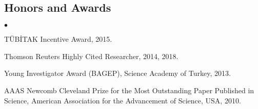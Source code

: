\documentclass[margin,line]{res}
\newenvironment{list2}{
  \begin{list}{$\bullet$}{%
      \setlength{\itemsep}{0.1cm}
      \setlength{\parsep}{0in} \setlength{\parskip}{0in}
      \setlength{\topsep}{0in} \setlength{\partopsep}{0in} 
      \setlength{\leftmargin}{0.2in}}}{\end{list}}
\newenvironment{list4}{
  \begin{list}{$\bullet$}{%
      \setlength{\itemsep}{0cm}
      \setlength{\parsep}{0in} \setlength{\parskip}{0in}
      \setlength{\topsep}{0in} \setlength{\partopsep}{0in} 
      \setlength{\leftmargin}{0.2in}}}{\end{list}}
\newcommand{\junk}[1]{}
\begin{document}
\begin{resume}
          \junk{
            \section{\sc Academic Experience}
                    {\bf Case Western Reserve University}, Cleveland, Ohio, USA\\
                    
                    \vspace{-.2cm}
                           {\em Graduate Student \& Research Assistant} \hfill {\bf August, 2000
                             - August 2005}\\
                           Included  Ph.D.~research, Ph.D. level course work and
                           research projects, reviewing papers for bioinformatics, algorithms and
                           database conferences and journals.
                           
                           {\em Teaching Assistant} \hfill {\bf August, 2000  - May 2001}\\
                           Duties included grading homeworks, and office hours. 
                           \begin{list2}
                           \item Systems Programming, Fall 2000
                           \item Introduction to Bioinformatics, Fall 2001
                           \item Analysis of Algorithms, Spring 2001
                           \end{list2}
          }
          
          \clearpage
          
          \vspace*{-.2cm}
          \section{\sc Honors and Awards} 
          \begin{list4}
          \item
            TÜBİTAK Incentive Award, 2015.
          \item
            Thomson Reuters Highly Cited Researcher, 2014, 2018.
          \item
            Young Investigator Award (BAGEP), Science Academy of Turkey, 2013.
          \item
            AAAS Newcomb Cleveland Prize for the Most Outstanding Paper Published in Science, American Association for the Advancement of Science, USA, 2010.
          \end{list4}
          


\end{resume}
\end{document}
